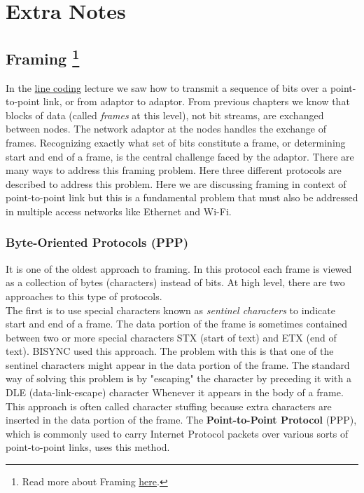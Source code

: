 \section{Extra Notes}
\subsection{Framing \footnote{Read more about Framing \href{https://book.systemsapproach.org/direct/framing.html}{here}.}}

In the \hyperref[line_coding]{line coding} lecture we saw how to transmit a sequence of bits over a point-to-point link, or from adaptor to adaptor. From previous chapters we know that blocks of data (called \textit{frames} at this level), not bit streams, are exchanged between nodes. The network adaptor at the nodes handles the exchange of frames. Recognizing exactly what set of bits constitute a frame, or determining start and end of a frame, is the central challenge faced by the adaptor. There are many ways to address this framing problem. Here three different protocols are described to address this problem. Here we are discussing framing in context of point-to-point link but this is a fundamental problem that must also be addressed in multiple access networks like Ethernet and Wi-Fi.

\subsubsection{Byte-Oriented Protocols (PPP)}

It is one of the oldest approach to framing. In this protocol each frame is viewed as a collection of bytes (characters) instead of bits. At high level, there are two approaches to this type of protocols.\\

The first is to use special characters known as \textit{sentinel characters} to indicate start and end of a frame. The data portion of the frame is sometimes contained between two or more special characters STX (start of text) and ETX (end of text). BISYNC used this approach. The problem with this is that one of the sentinel characters might appear in the data portion of the frame. The standard way of solving this problem is by "escaping" the character by preceding it with a DLE (data-link-escape) character Whenever it appears in the body of a frame. This approach is often called character stuffing because extra characters are inserted in the data portion of the frame. The \textbf{Point-to-Point Protocol} (PPP), which is commonly used to carry Internet Protocol packets over various sorts of point-to-point links, uses this method.

